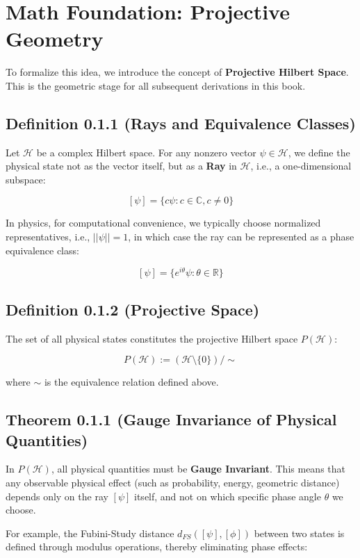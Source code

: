 \documentclass[11pt,a4paper,twoside]{book}
\begin{document}
\section{Math Foundation: Projective Geometry}

To formalize this idea, we introduce the concept of \textbf{Projective Hilbert Space}. This is the geometric stage for all subsequent derivations in this book.

\subsection{Definition 0.1.1 (Rays and Equivalence Classes)}

Let $\mathcal{H}$ be a complex Hilbert space. For any nonzero vector $\psi \in \mathcal{H}$, we define the physical state not as the vector itself, but as a \textbf{Ray} in $\mathcal{H}$, i.e., a one-dimensional subspace:

$$[\psi] = \{ c\psi : c \in \mathbb{C}, c \neq 0 \}$$

In physics, for computational convenience, we typically choose normalized representatives, i.e., $||\psi|| = 1$, in which case the ray can be represented as a phase equivalence class:

$$[\psi] = \{ e^{i\theta}\psi : \theta \in \mathbb{R} \}$$

\subsection{Definition 0.1.2 (Projective Space)}

The set of all physical states constitutes the projective Hilbert space $P(\mathcal{H})$:

$$P(\mathcal{H}) := (\mathcal{H} \setminus \{0\}) / \sim$$

where $\sim$ is the equivalence relation defined above.

\subsection{Theorem 0.1.1 (Gauge Invariance of Physical Quantities)}

In $P(\mathcal{H})$, all physical quantities must be \textbf{Gauge Invariant}. This means that any observable physical effect (such as probability, energy, geometric distance) depends only on the ray $[\psi]$ itself, and not on which specific phase angle $\theta$ we choose.

For example, the Fubini-Study distance $d_{FS}([\psi], [\phi])$ between two states is defined through modulus operations, thereby eliminating phase effects:
\end{document}

